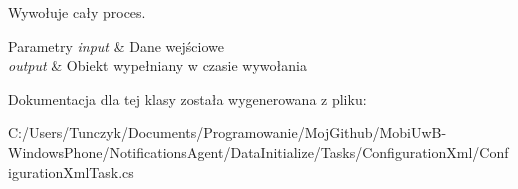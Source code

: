 Wywołuje cały proces. 


\begin{DoxyParams}{Parametry}
{\em input} & Dane wejściowe\\
\hline
{\em output} & Obiekt wypełniany w czasie wywołania\\
\hline
\end{DoxyParams}


Dokumentacja dla tej klasy została wygenerowana z pliku\+:\begin{DoxyCompactItemize}
\item 
C\+:/\+Users/\+Tunczyk/\+Documents/\+Programowanie/\+Moj\+Github/\+Mobi\+Uw\+B-\/\+Windows\+Phone/\+Notifications\+Agent/\+Data\+Initialize/\+Tasks/\+Configuration\+Xml/Configuration\+Xml\+Task.\+cs\end{DoxyCompactItemize}
